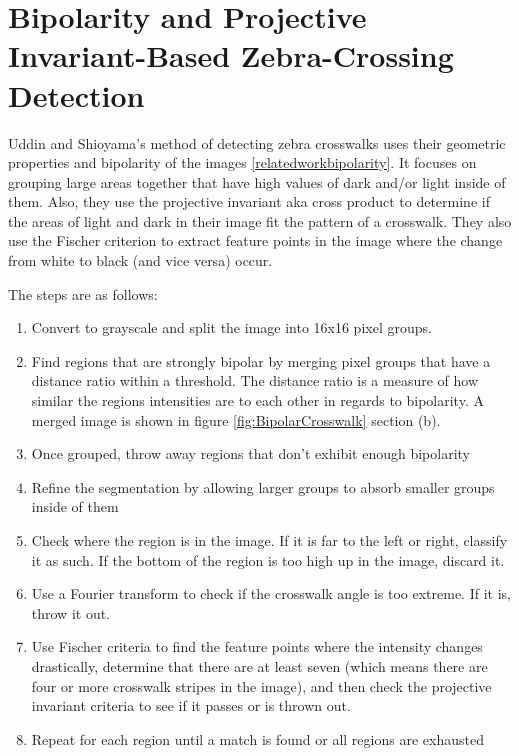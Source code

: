 \documentclass[12pt]{ucthesis}
\begin{document}

\section{Bipolarity and Projective Invariant-Based Zebra-Crossing Detection}

Uddin and Shioyama's method of detecting zebra crosswalks uses their geometric properties and bipolarity of the images \ref{relatedworkbipolarity}. It focuses on grouping large areas together that have high values of dark and/or light inside of them. Also, they use the projective invariant aka cross product to determine if the areas of light and dark in their image fit the pattern of a crosswalk. They also use the Fischer criterion to extract feature points in the image where the change from white to black (and vice versa) occur.

The steps are as follows:
\begin{enumerate}
   \item Convert to grayscale and split the image into 16x16 pixel groups.
   \item Find regions that are strongly bipolar by merging pixel groups that have a distance ratio within a threshold. The distance ratio is a measure of how similar the regions intensities are to each other in regards to bipolarity. A merged image is shown in figure \ref{fig:BipolarCrosswalk} section  (b).
   \item Once grouped, throw away regions that don't exhibit enough bipolarity
   \item Refine the segmentation by allowing larger groups to absorb smaller groups inside of them
   \item Check where the region is in the image. If it is far to the left or right, classify it as such. If the bottom of the region is too high up in the image, discard it.
   \item Use a Fourier transform to check if the crosswalk angle is too extreme. If it is, throw it out. 
   \item Use Fischer criteria to find the feature points where the intensity changes drastically, determine that there are at least seven (which means there are four or more crosswalk stripes in the image), and then check the projective invariant criteria to see if it passes or is thrown out. 
   \item Repeat for each region until a match is found or all regions are exhausted
\end{enumerate}
\end{document}
